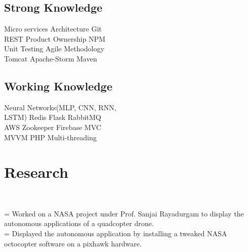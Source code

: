 \documentclass[]{rinkal_resume}
\begin{document}
\begin{minipage}[t]{0.30\textwidth}
\vspace{1pt}
\subsection{Strong Knowledge}
\vspace{1pt}
Micro services Architecture \textbullet{}
Git \textbullet{} \\
REST \textbullet{} 
Product Ownership \textbullet{} 
NPM \textbullet{} \\
Unit Testing \textbullet{}
Agile Methodology \textbullet{} \\
Tomcat \textbullet{}
Apache-Storm \textbullet{}
Maven \textbullet{}
\sectionsep

\vspace{1pt}
\subsection{Working Knowledge}
\vspace{1pt}
Neural Networks(MLP, CNN, RNN, \\ LSTM)  \textbullet{}
Redis \textbullet{}
Flask \textbullet{}
RabbitMQ \textbullet{} \\
AWS \textbullet{}
Zookeeper \textbullet{}
Firebase \textbullet{} 
MVC \textbullet{} \\
MVVM \textbullet{} 
PHP \textbullet{} 
Multi-threading \textbullet{} 
\sectionsep


\section{Research}
 \\

\newlength\boxwid
\settowidth{\boxwid}{\indent\hspace{0.5cm}}

\hspace{0.2cm} \hangindent=\boxwid 
\textbullet{} Worked on a NASA project under Prof. Sanjai Rayadurgam to display the autonomous applications of a quadcopter drone. \\
\hspace{0.2cm} \hangindent=\boxwid 
\textbullet{} Displayed the autonomous application by installing a tweaked NASA octocopter software on a pixhawk hardware. \\
\smallsectionsep


\end{minipage}
\end{document}
